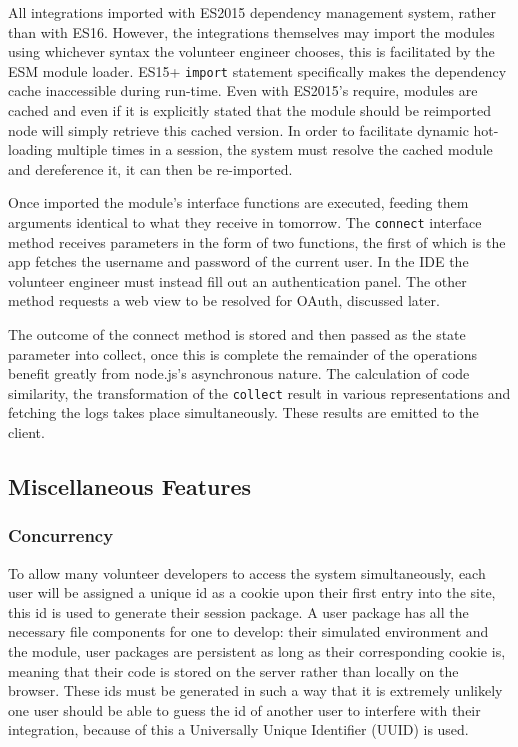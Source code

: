 \documentclass[jou,apacite]{apa6}
\begin{document}
All integrations imported with ES2015 dependency management system, rather than with ES16. However, the integrations themselves may import the modules using whichever syntax the volunteer engineer chooses, this is facilitated by the ESM module loader.  ES15+ \texttt{import} statement specifically makes the dependency cache inaccessible during run-time.  Even with ES2015's require, modules are cached and even if it is explicitly stated that the module should be reimported node will simply retrieve this cached version. In order to facilitate dynamic hot-loading multiple times in a session, the system must resolve the cached module and dereference it, it can then be re-imported. 

Once imported the module's interface functions are executed, feeding them arguments identical to what they receive in tomorrow. The \texttt{connect} interface method receives parameters in the form of two functions, the first of which is the app fetches the username and password of the current user. In the IDE the volunteer engineer must instead fill out an authentication panel. The other method requests a web view to be resolved for OAuth, discussed later. 

The outcome of the connect method is stored and then passed as the state parameter into collect, once this is complete the remainder of the operations benefit greatly from node.js's asynchronous nature. The calculation of code similarity, the transformation of the \texttt{collect} result in various representations and fetching the logs takes place simultaneously. These results are emitted to the client.
\subsection{Miscellaneous Features}
\subsubsection{Concurrency}
To allow many volunteer developers to access the system simultaneously, each user will be assigned a unique id as a cookie upon their first entry into the site, this id is used to generate their session package. A user package has all the necessary file components for one to develop: their simulated environment and the module, user packages are persistent as long as their corresponding cookie is, meaning that their code is stored on the server rather than locally on the browser. These ids must be generated in such a way that it is extremely unlikely one user should be able to guess the id of another user to interfere with their integration, because of this a Universally Unique Identifier (UUID) is used.
\end{document}
